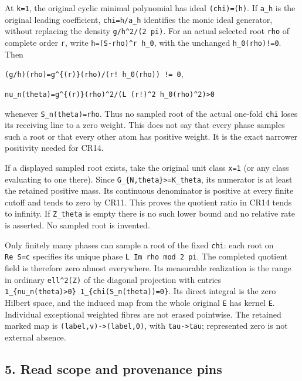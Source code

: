 At \texttt{k=1}, the original cyclic minimal polynomial has ideal \texttt{(chi)=(h)}. If \texttt{a\_h} is the original leading coefficient, \texttt{chi=h/a\_h} identifies the monic ideal generator, without replacing the density \texttt{\textbar{}g/h\textbar{}\^{}2/(2\ pi)}. For an actual selected root \texttt{rho} of complete order \texttt{r}, write \texttt{h=(S-rho)\^{}r\ h\_0}, with the unchanged \texttt{h\_0(rho)!=0}. Then

\texttt{(g/h)(rho)=g\^{}\{(r)\}(rho)/(r!\ h\_0(rho))\ !=\ 0},

\texttt{nu\_n(theta)=\textbar{}g\^{}\{(r)\}(rho)\textbar{}\^{}2/(L\ (r!)\^{}2\ \textbar{}h\_0(rho)\textbar{}\^{}2)\textgreater{}0}

whenever \texttt{S\_n(theta)=rho}. Thus no sampled root of the actual one-fold \texttt{chi} loses its receiving line to a zero weight. This does not say that every phase samples such a root or that every other atom has positive weight. It is the exact narrower positivity needed for CR14.

If a displayed sampled root exists, take the original unit class \texttt{x=1} (or any class evaluating to one there). Since \texttt{G\_\{N,theta\}\textgreater{}=K\_theta}, its numerator is at least the retained positive mass. Its continuous denominator is positive at every finite cutoff and tends to zero by CR11. This proves the quotient ratio in CR14 tends to infinity. If \texttt{Z\_theta} is empty there is no such lower bound and no relative rate is asserted. No sampled root is invented.

Only finitely many phases can sample a root of the fixed \texttt{chi}: each root on \texttt{Re\ S=c} specifies its unique phase \texttt{L\ Im\ rho\ mod\ 2\ pi}. The completed quotient field is therefore zero almost everywhere. Its measurable realization is the range in ordinary \texttt{ell\^{}2(Z)} of the diagonal projection with entries \texttt{1\_\{nu\_n(theta)\textgreater{}0\}\ 1\_\{chi(S\_n(theta))=0\}}. Its direct integral is the zero Hilbert space, and the induced map from the whole original \texttt{E} has kernel \texttt{E}. Individual exceptional weighted fibres are not erased pointwise. The retained marked map is \texttt{(label,v)-\textgreater{}(label,0)}, with \texttt{tau-\textgreater{}tau}; represented zero is not external absence.

\subsection{5. Read scope and provenance pins}\label{read-scope-and-provenance-pins}

